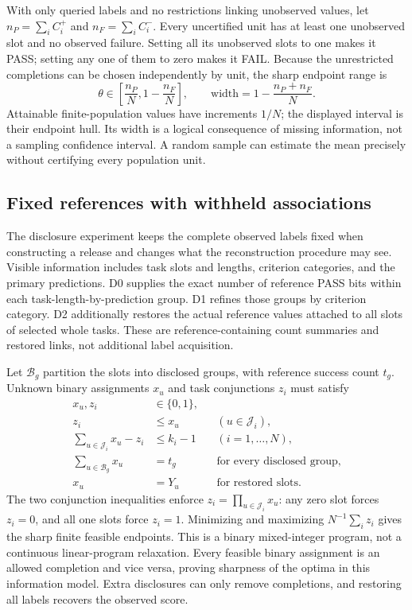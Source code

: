 With only queried labels and no restrictions linking unobserved values,
let $n_P=\sum_i C_i^+$ and $n_F=\sum_i C_i^-$. Every uncertified unit has
at least one unobserved slot and no observed failure. Setting all its
unobserved slots to one makes it PASS; setting any one of them to zero makes
it FAIL. Because the unrestricted completions can be chosen independently
by unit, the sharp endpoint range is
\begin{equation}
 \theta\in\left[\frac{n_P}{N},1-\frac{n_F}{N}\right],
 \qquad \text{width}=1-\frac{n_P+n_F}{N}.
 \label{app:eq:query-only}
\end{equation}
Attainable finite-population values have increments $1/N$; the displayed
interval is their endpoint hull. Its width is a logical consequence of
missing information, not a sampling confidence interval. A random sample
can estimate the mean precisely without certifying every population unit.

\subsection{Fixed references with withheld associations}
\label{app:milp}

The disclosure experiment keeps the complete observed labels fixed when
constructing a release and changes what the reconstruction procedure may
see. Visible information includes task slots and lengths, criterion
categories, and the primary predictions. D0 supplies the exact number of
reference PASS bits within each task-length-by-prediction group. D1 refines
those groups by criterion category. D2 additionally restores the actual
reference values attached to all slots of selected whole tasks. These are
reference-containing count summaries and restored links, not additional
label acquisition.

Let $\mathcal B_g$ partition the slots into disclosed groups, with reference
success count $t_g$. Unknown binary assignments $x_u$ and task conjunctions
$z_i$ must satisfy
\begin{align}
 x_u,z_i&\in\{0,1\},\\
 z_i&\leq x_u &&(u\in\mathcal J_i),\\
 \sum_{u\in\mathcal J_i}x_u-z_i&\leq k_i-1 &&(i=1,\ldots,N),\\
 \sum_{u\in\mathcal B_g}x_u&=t_g &&\text{for every disclosed group},\\
 x_u&=Y_u &&\text{for restored slots}.
 \label{app:eq:milp}
\end{align}
The two conjunction inequalities enforce
$z_i=\prod_{u\in\mathcal J_i}x_u$: any zero slot forces $z_i=0$, and all
one slots force $z_i=1$. Minimizing and maximizing $N^{-1}\sum_i z_i$ gives
the sharp finite feasible endpoints. This is a binary mixed-integer
program, not a continuous linear-program relaxation. Every feasible binary
assignment is an allowed completion and vice versa, proving sharpness of
the optima in this information model. Extra disclosures can only remove
completions, and restoring all labels recovers the observed score.

